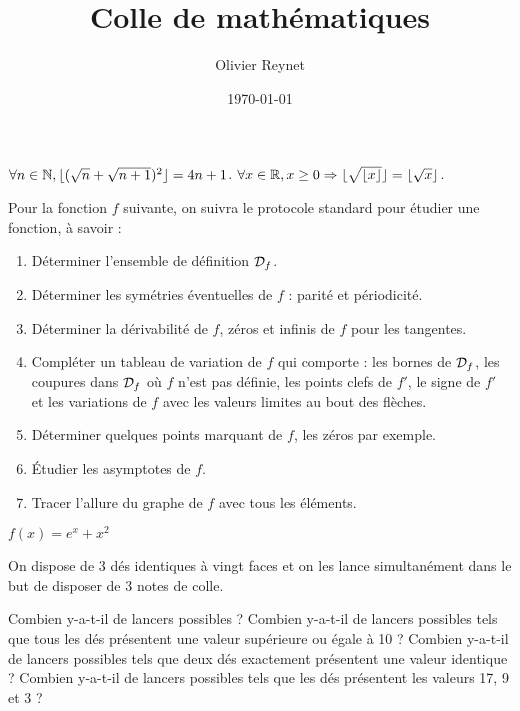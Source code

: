 \documentclass[french,12pt,a4paper]{article}
\author{Olivier Reynet}
\title{Colle de mathématiques}
\date{\today}
\begin{document}
\maketitle

\begin{exercise}[subtitle= Racine carrée et  partie entière]
	\begin{tasks}
		\task \Mq $\forall n \in \mathbb{N}, \lfloor ( \sqrt{n} + \sqrt{n+1})^2 \rfloor = 4n +1$.
		\task \Mq  $\forall x \in \mathbb{R}, x \ge 0 \Rightarrow \lfloor \sqrt{\lfloor x \rfloor}\rfloor = \lfloor \sqrt{x} \rfloor$.
	\end{tasks}
\end{exercise}


\begin{exercise}[subtitle= Étude d'une fonction]
	Pour la fonction $f$ suivante, on suivra le protocole standard pour étudier une fonction, à savoir :
	\begin{enumerate}
		\item Déterminer l'ensemble de définition $\mathcal{D}_f$.
		\item Déterminer les symétries éventuelles de $f$ : parité et périodicité.
		\item Déterminer la dérivabilité de $f$,  zéros et infinis de $f$ pour les tangentes.
		\item Compléter un tableau de variation de $f$ qui comporte : les bornes de $\mathcal{D}_f$, les coupures dans $\mathcal{D}_f$ où $f$ n'est pas définie, les points clefs de $f'$, le signe de $f'$ et les variations de $f$ avec les valeurs limites au bout des flèches.
		\item Déterminer quelques points marquant de $f$, les zéros par exemple.
		\item Étudier les asymptotes de $f$.
		\item Tracer l'allure du graphe de $f$ avec tous les éléments.
	\end{enumerate}

	 $f(x)= e^{x}+x^2$

\end{exercise}

	\begin{exercise}[subtitle= Dé à 20 faces]
		On dispose de 3 dés identiques à vingt faces et on les lance simultanément dans le but de disposer de 3 notes de colle. 
		\begin{tasks}
			\task Combien y-a-t-il de lancers possibles ?
			\task Combien y-a-t-il de lancers possibles tels que tous les dés présentent une valeur supérieure ou égale à 10 ?
			\task Combien y-a-t-il de lancers possibles tels que deux dés exactement présentent une valeur identique ? 
			\task Combien y-a-t-il de lancers possibles tels que les dés présentent  les valeurs 17, 9 et 3 ?
		\end{tasks}
	\end{exercise}
\end{document}
